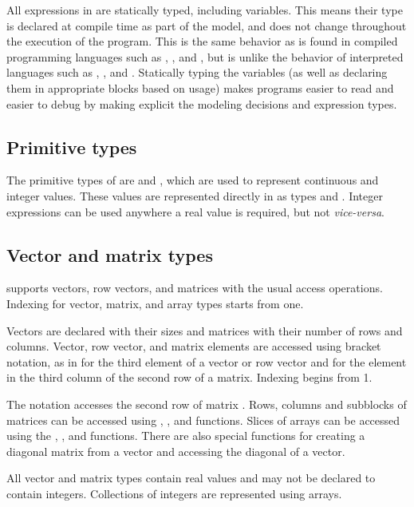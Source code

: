 \documentclass[article]{jss}
\begin{document}
All expressions in  are statically typed, including
variables.  This means their type is declared at compile time as part
of the model, and does not change throughout the execution of the
program.  This is the same behavior as is found in compiled
programming languages such as , ,
and , but is unlike the behavior of interpreted
languages such as , , and
.  Statically typing the variables (as well as
declaring them in appropriate blocks based on usage) makes
 programs easier to read and easier to debug by making
explicit the modeling decisions and expression types.

\subsection{Primitive types}

The primitive types of  are  and ,
which are used to represent continuous and integer values.  These
values are represented directly in  as types
 and .  Integer expressions can be used
anywhere a real value is required, but not {\it vice-versa}.  

\subsection{Vector and matrix types}

 supports vectors, row vectors, and matrices with the
usual access operations.  Indexing for vector, matrix, and array types
starts from one.  

Vectors are declared with their sizes and matrices with their number
of rows and columns.  Vector, row vector, and matrix elements are
accessed using bracket notation, as in  for the third
element of a vector or row vector and  for the element in
the third column of the second row of a matrix.  Indexing begins from
1.  

The notation  accesses the second row of matrix .
Rows, columns and subblocks of matrices can be accessed using
, , and  functions.  Slices of arrays
can be accessed using the , , and 
functions.  There are also special functions for creating a diagonal
matrix from a vector and accessing the diagonal of a vector.

All vector and matrix types contain real values and may not be
declared to contain integers.  Collections of integers are represented
using arrays.
\end{document}
